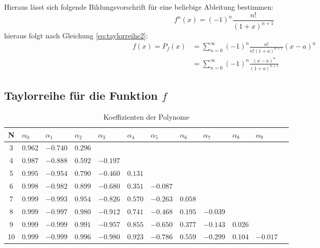 \documentclass{beamer}
\begin{document}
  \begin{frame}
    Hieraus lässt sich folgende Bildungsvorschrift für eine beliebige Ableitung bestimmen:
    \begin{equation}
        f^n\left(x\right) = \left(-1\right)^n \frac{n!}{\left(1+x\right)^{n+1}}
    \end{equation}
    hieraus folgt nach Gleichung \ref{eq:taylorreihe2}:
    \begin{align}
        f\left(x\right)  =  P_f\left(x\right) 
                        &= \sum_{n=0}^{\infty} \left(-1\right)^n
                            \frac{n!}{n!\left(1+a\right)^{n+1}}\left(x-a\right)^n\\
                        &=  \sum_{n=0}^{\infty} \left(-1\right)^n
                            \frac{\left(x-a\right)^n}{\left(1+a\right)^{n+1}}
    \end{align}
  \end{frame}
    
  \subsection{Taylorreihe für die Funktion $f$}
  \begin{frame}
    \centering    
    \begin{table}[htbp]
    \tiny   
    \renewcommand{\arraystretch}{1.5}
    \begin{tabularx}{\textwidth}{|c|X|X|X|X|X|X|X|X|X|X|X|}
        \hline    
        N & $\alpha_0$&$\alpha_1$&$\alpha_2$&$\alpha_3$&$\alpha_4$&$\alpha_5$&$\alpha_6$&$\alpha_7$&$\alpha_8$&$\alpha_9$\\\hline
        3 & $0.962$ & $-0.740$ & $0.296$ &&&&&&& \\\hline
        4 & $0.987$ & $-0.888$ & $0.592$ & $-0.197$ &&&&&& \\\hline
        5 & $0.995$ & $-0.954$ & $0.790$ & $-0.460$ & $0.131$ &&&&& \\\hline
        6 & $0.998$ & $-0.982$ & $0.899$ & $-0.680$ & $0.351$ & $-0.087$ &&&& \\\hline
        7 & $0.999$ & $-0.993$ & $0.954$ & $-0.826$ & $0.570$ & $-0.263$ & $0.058$ &&& \\\hline
        8 & $0.999$ & $-0.997$ & $0.980$ & $-0.912$ & $0.741$ & $-0.468$ & $0.195$ & $-0.039$ && \\\hline
        9 & $0.999$ & $-0.999$ & $0.991$ & $-0.957$ & $0.855$ & $-0.650$ & $0.377$ & $-0.143$ & $0.026$ & \\\hline
        10& $0.999$ & $-0.999$ & $0.996$ & $-0.980$ & $0.923$ & $-0.786$ & $0.559$ & $-0.299$ & $0.104$ & $-0.017$ \\\hline
    \end{tabularx}
    \caption{Koeffizienten der Polynome}      
    \end{table}
  \end{frame}
  
\end{document}
